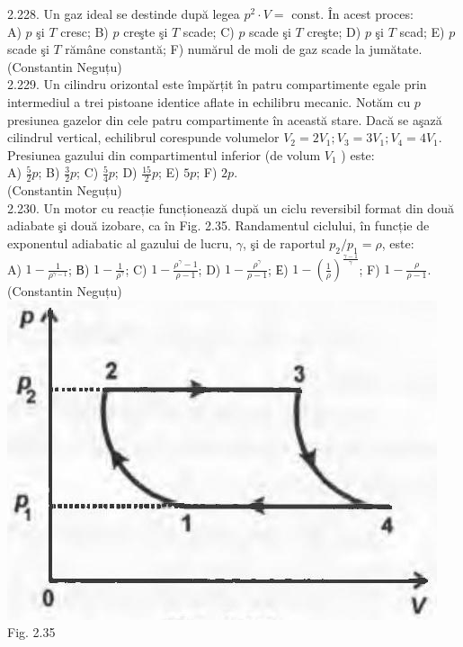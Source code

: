 \documentclass[10pt]{article}
\begin{document}
2.228. Un gaz ideal se destinde după legea $p^{2} \cdot V=$ const. În acest proces:\\ A) $p$ şi $T$ cresc; B) $p$ creşte şi $T$ scade; C) $p$ scade şi $T$ creşte; D) $p$ şi $T$ scad; E) $p$ scade şi $T$ rămâne constantă; F) numărul de moli de gaz scade la jumătate.\\ (Constantin Neguțu)\\

2.229. Un cilindru orizontal este împărțit în patru compartimente egale prin intermediul a trei pistoane identice aflate in echilibru mecanic. Notăm cu $p$ presiunea gazelor din cele patru compartimente în această stare. Dacă se aşază cilindrul vertical, echilibrul corespunde volumelor $V_{2}=2 V_{1} ; V_{3}=3 V_{1} ; V_{4}=4 V_{1}$. Presiunea gazului din compartimentul inferior (de volum $V_{1}$ ) este:\\ A) $\frac{5}{2} p$; B) $\frac{3}{2} p$; C) $\frac{5}{4} p$; D) $\frac{15}{2} p$; E) $5 p$; F) $2 p$.\\ (Constantin Neguțu)\\

2.230. Un motor cu reacție funcționează după un ciclu reversibil format din două adiabate şi două izobare, ca în Fig. 2.35. Randamentul ciclului, în funcție de exponentul adiabatic al gazului de lucru, $\gamma$, şi de raportul $p_{2} / p_{1}=\rho$, este:\\ A) $1-\frac{1}{\rho^{\gamma-1}}$; В) $1-\frac{1}{\rho^{\gamma}}$; C) $1-\frac{\rho^{\gamma}-1}{\rho-1}$; D) $1-\frac{\rho^{\gamma}}{\rho-1}$; Е) $1-\left(\frac{1}{\rho}\right)^{\frac{\gamma-1}{\gamma}}$; F) $1-\frac{\rho}{\rho-1}$.\\ (Constantin Neguțu)\\ \includegraphics[max width=\textwidth, center]{2025_07_01_5b3ff9fa0d508c8e9f17g-125} Fig. 2.35\\
\end{document}
